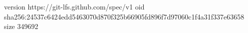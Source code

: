 version https://git-lfs.github.com/spec/v1
oid sha256:24537c6424edd5463070d870f325b66905fd896f7d97060c1f4a31f337e63658
size 349692

